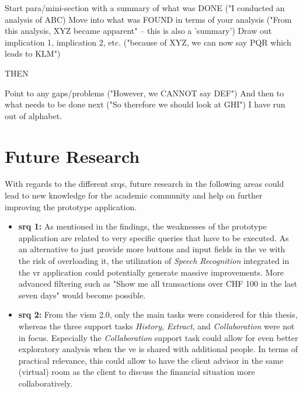 Start para/mini-section with a summary of what was DONE ("I conducted an analysis of ABC)
Move into what was FOUND in terms of your analysis ("From this analysis, XYZ became apparent" -- this is also a 'summary')
Draw out implication 1, implication 2, etc. ("because of XYZ, we can now say PQR which leads to KLM")

THEN

Point to any gaps/problems ("However, we CANNOT say DEF")
And then to what needs to be done next ("So therefore we should look at GHI")
I have run out of alphabet.





\section{Future Research}

With regards to the different \glspl{srq}, future research in the following areas could lead to new knowledge for the academic community and help on further improving the prototype application.
\begin{itemize}[]
	\item \textbf{\gls{srq} 1:} As mentioned in the findings, the weaknesses of the prototype application are related to very specific queries that have to be executed. As an alternative to just provide more buttons and input fields in the \gls{ve} with the risk of overloading it, the utilization of \textit{Speech Recognition} integrated in the \gls{vr} application could potentially generate massive improvements. More advanced filtering such as "Show me all transactions over CHF 100 in the last seven days" would become possible.
	
	\item \textbf{\gls{srq} 2:} From the \gls{vism} 2.0, only the main tasks were considered for this thesis, whereas the three support tasks \textit{History}, \textit{Extract}, and \textit{Collaboration} were not in focus. Especially the \textit{Collaboration} support task could allow for even better exploratory analysis when the \gls{ve} is shared with additional people. In terms of practical relevance, this could allow to have the client advisor in the same (virtual) room as the client to discuss the financial situation more collaboratively.
\end{itemize}


